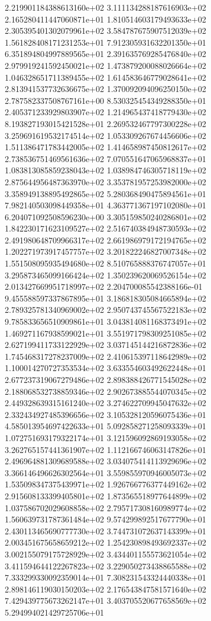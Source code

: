 2.219901184388613160e+02 3.111134288187616903e+02 2.165280411447060871e+01
1.810514603179493633e+02 2.305395401302079961e+02 3.584787675907512039e+02
1.561828408171231253e+01 7.912305931632201350e+01 6.351894804997889565e+01
2.391635769285476840e+02 2.979919241592450021e+02 1.473879200088026664e+02
1.046328651711389455e+02 1.614583646779028641e+02 2.813941537732636675e+02
1.370092094096250150e+02 2.787582337508767161e+00 8.530325454349288350e+01
2.405371233929803907e+02 1.214965437418779430e+02 8.193827193015421528e+01
2.269532467797300228e+02 3.259691619532174514e+02 1.053309267674456606e+02
1.511386471783442005e+02 1.414658987450812617e+02 2.738536751469561636e+02
7.070551647065968837e+01 1.083813085859238043e+02 1.038984746305718119e+02
2.875644956487363970e+02 3.353781957253982000e+02 3.358949138895492865e+02
5.280368490475894561e+01 7.982140503098449358e+01 4.363771367197102080e+01
6.204071092508596230e+00 3.305159850240286801e+02 1.842230171623109527e+02
2.516740384948730593e+02 2.491980648709966317e+02 2.661986979172194765e+02
1.202271973917457757e+02 3.201822246827007348e+02 1.551508095935494680e+02
8.510765888376747057e+01 3.295873465099166424e+02 1.350239620069526154e+02
2.013427669951718997e+02 2.204700085542388166e-01 9.455588597337867895e+01
3.186818305084665894e+02 2.789325781340969002e+02 2.950743745567522183e+02
9.785833656510909861e+01 3.043814081168373491e+02 1.469271167938599021e+01
3.551971798309251085e+02 2.627199411733122929e+02 3.037145144216872836e+02
1.745468317278237009e+02 2.410615397118642989e+02 1.100014270727353534e+02
3.633554603492622448e+01 2.677237319067279486e+02 2.898388426771545028e+02
2.188068532738859346e+02 2.902673885544070345e+02 2.449328639315161240e+02
3.274622709945047632e+02 2.332434927485396656e+02 3.105328120596075436e+01
4.585013954697422633e+01 5.092858271258093339e+01 1.072751693179322174e+01
3.121596092869193058e+02 3.262765157441361907e+02 1.112166746063147826e+01
2.496964881309689588e+02 3.034075414113929696e+02 3.366146496626302564e+01
3.559855970946005073e+02 1.535098347375439971e+02 1.926766776377449162e+02
2.915608133399405801e+02 1.873565518977644899e+02 1.037586702029608858e+02
2.795717308160989774e+02 1.560639731787361484e+02 9.574299892517677790e+01
2.430113465690777730e+02 3.744731072637143399e+01 2.003451675658659212e+02
1.254230898493692337e+02 3.002155079175728929e+02 3.434401155573621054e+02
3.411594644122267823e+02 3.229050273438865588e+02 7.333299330092359014e+01
7.308231543324440338e+01 2.898146119030150203e+02 2.176543847581571640e+02
7.429439775673262147e+01 3.403705520677658569e+02 5.294994021429725706e+01
